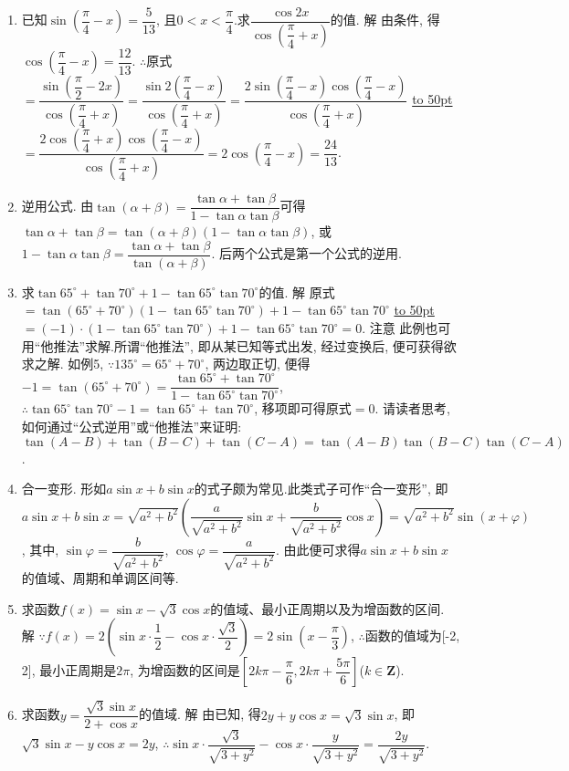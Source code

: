 \documentclass[10pt,a4paper]{article}
\newcommand{\blank}[1]{\underline{\hbox to #1pt{}}}
\begin{document}
\begin{enumerate}[1.]
\item 已知$\sin (\dfrac{\pi}4-x)=\dfrac 5{13}$, 且$0<x<\dfrac{\pi}4$.求$\dfrac{\cos 2x}{\cos (\dfrac{\pi}4+x)}$的值.
解  由条件, 得$\cos (\dfrac\pi 4-x)=\dfrac {12}{13}$.
$\therefore$原式$=\dfrac{\sin (\dfrac{\pi}2-2x)}{\cos (\dfrac{\pi}4+x)}=\dfrac{\sin 2(\dfrac{\pi}4-x)}{\cos (\dfrac{\pi}4+x)}=\dfrac{2\sin (\dfrac{\pi}4-x)\cos (\dfrac{\pi}4-x)}{\cos (\dfrac{\pi}4+x)}$
\blank{50}$=\dfrac{2\cos (\dfrac\pi 4+x)\cos (\dfrac{\pi}4-x)}{\cos (\dfrac{\pi}4+x)}=2\cos (\dfrac{\pi}4-x)=\dfrac {24}{13}$.
\item 逆用公式.
由$\tan (\alpha +\beta)=\dfrac{\tan \alpha +\tan \beta}{1-\tan \alpha \tan \beta}$可得
$\tan \alpha +\tan \beta =\tan (\alpha +\beta)(1-\tan \alpha \tan \beta)$, 或$1-\tan \alpha \tan \beta =\dfrac{\tan \alpha +\tan \beta}{\tan (\alpha +\beta)}$.
后两个公式是第一个公式的逆用.
\item 求$\tan 65^\circ +\tan 70^\circ +1-\tan 65^\circ \tan 70^\circ$的值.
解  原式$=\tan (65^\circ +70^\circ)(1-\tan 65^\circ \tan 70^\circ)+1-\tan 65^\circ \tan 70^\circ$
\blank{50}$=(-1)\cdot (1-\tan 65^\circ \tan 70^\circ)+1-\tan 65^\circ \tan 70^\circ =0$.
注意  此例也可用``他推法''求解.所谓``他推法'', 即从某已知等式出发, 经过变换后, 便可获得欲求之解.
如例5, $\because 135^\circ =65^\circ +70^\circ$, 两边取正切, 便得$-1=\tan (65^\circ +70^\circ)=\dfrac{\tan 65^\circ +\tan 70^\circ}{1-\tan 65^\circ \tan 70^\circ}$,
$\therefore \tan 65^\circ \tan 70^\circ -1=\tan 65^\circ +\tan 70^\circ$, 移项即可得原式$=0$.
请读者思考, 如何通过``公式逆用''或``他推法''来证明:
$\tan (A-B)+\tan (B-C)+\tan (C-A)=\tan (A-B)\tan (B-C)\tan (C-A)$.
\item 合一变形.
形如$a\sin x+b\sin x$的式子颇为常见.此类式子可作``合一变形'', 即
$a\sin x+b\sin x=\sqrt {a^2+b^2}(\dfrac a{\sqrt {a^2+b^2}}\sin x+\dfrac b{\sqrt {a^2+b^2}}\cos x)=\sqrt {a^2+b^2}\sin (x+\varphi)$,
其中, $\sin \varphi =\dfrac b{\sqrt {a^2+b^2}}$, $\cos \varphi =\dfrac a{\sqrt {a^2+b^2}}$.
由此便可求得$a\sin x+b\sin x$的值域、周期和单调区间等.
\item 求函数$f(x)=\sin x-\sqrt 3\cos x$的值域、最小正周期以及为增函数的区间.
解  $\because f(x)=2(\sin x\cdot \dfrac 12-\cos x\cdot \dfrac{\sqrt 3}2)=2\sin (x-\dfrac{\pi}3)$,
$\therefore$函数的值域为[-2, 2], 最小正周期是$2\pi$, 为增函数的区间是$[2k\pi -\dfrac{\pi}6,2k\pi +\dfrac{5\pi}6]$($k\in \mathbf{Z}$).
\item 求函数$y=\dfrac{\sqrt 3\sin x}{2+\cos x}$的值域.
解  由已知, 得$2y+y\cos x=\sqrt 3\sin x$, 即$\sqrt 3\sin x-y\cos x=2y$,
$\therefore \sin x\cdot \dfrac{\sqrt 3}{\sqrt {3+y^2}}-\cos x\cdot \dfrac y{\sqrt {3+y^2}}=\dfrac{2y}{\sqrt {3+y^2}}$.

\end{enumerate}
\end{document}

